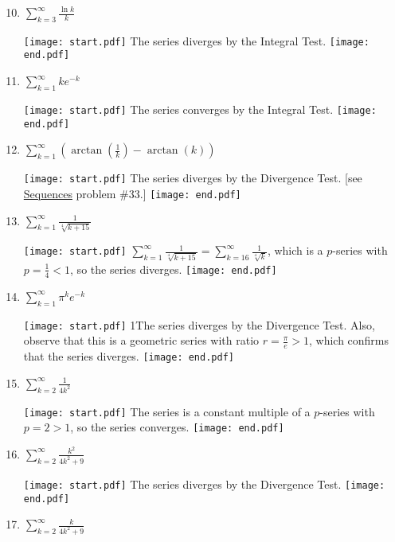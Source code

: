 \documentclass[12pt]{article}
\begin{document}
\begin{enumerate}
\setcounter{enumi}{9}

\item $\sum_{k=3}^{\infty}\frac{\ln{k}}{k}$

\texttt{[image: start.pdf]}
{{The series diverges by the Integral Test.}}
\texttt{[image: end.pdf]}


\item $\sum_{k=1}^{\infty}{ke^{-k}}$

\texttt{[image: start.pdf]}
{{The series converges by the Integral Test.}}
\texttt{[image: end.pdf]}


\item $\sum_{k=1}^{\infty}{\left(\arctan\left(\frac{1}{k}\right)-\arctan(k)\right)}$

\texttt{[image: start.pdf]}
{{The series diverges by the Divergence Test. [see \underline{Sequences} problem \#33.]}}
\texttt{[image: end.pdf]}


\item $\sum_{k=1}^{\infty}{\frac{1}{\sqrt[4]{k+15}}}$

\texttt{[image: start.pdf]}
{{$\sum_{k=1}^{\infty}{\frac{1}{\sqrt[4]{k+15}}}=\sum_{k=16}^{\infty}{\frac{1}{\sqrt[4]{k}}}$, which is a $p$-series with $p=\frac{1}{4}<1$, so the series diverges.   }}
\texttt{[image: end.pdf]}


\item $\sum_{k=1}^{\infty}{\pi^k e^{-k}}$

\texttt{[image: start.pdf]}
{{{1\linewidth}{The series diverges by the Divergence Test. Also, observe that this is a geometric series with ratio $r=\textstyle \frac{\pi}{e}>1$, which confirms that the series diverges.}}}
\texttt{[image: end.pdf]}


\item $\sum_{k=2}^{\infty}{\frac{1}{4k^2}}$

\texttt{[image: start.pdf]}
{{The series is a constant multiple of a $p$-series with $p=2>1$, so the series converges.}}
\texttt{[image: end.pdf]}


\item $\sum_{k=2}^{\infty}{\frac{k^2}{4k^2+9}}$

\texttt{[image: start.pdf]}
{{The series diverges by the Divergence Test.}}
\texttt{[image: end.pdf]}


\item $\sum_{k=2}^{\infty}{\frac{k}{4k^2+9}}$


\end{enumerate}
\end{document}
